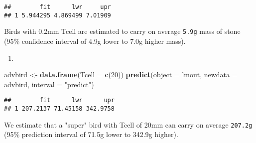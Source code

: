 \documentclass[
]{article}
\newenvironment{Shaded}{\begin{snugshade}}{\end{snugshade}}
\newcommand{\AttributeTok}[1]{\textcolor[rgb]{0.13,0.29,0.53}{#1}}
\newcommand{\DecValTok}[1]{\textcolor[rgb]{0.00,0.00,0.81}{#1}}
\newcommand{\FunctionTok}[1]{\textcolor[rgb]{0.13,0.29,0.53}{\textbf{#1}}}
\newcommand{\NormalTok}[1]{#1}
\newcommand{\OtherTok}[1]{\textcolor[rgb]{0.56,0.35,0.01}{#1}}
\newcommand{\StringTok}[1]{\textcolor[rgb]{0.31,0.60,0.02}{#1}}
\providecommand{\tightlist}{%
  \setlength{\itemsep}{0pt}\setlength{\parskip}{0pt}}
\begin{document}
\begin{verbatim}
##        fit      lwr     upr
## 1 5.944295 4.869499 7.01909
\end{verbatim}

Birds with 0.2mm Tcell are estimated to carry on average \texttt{5.9g}
mass of stone (95\% confidence interval of 4.9g lower to 7.0g higher
mass).

\begin{enumerate}
\def\labelenumi{\arabic{enumi}.}
\setcounter{enumi}{3}
\tightlist
\item
\end{enumerate}

\begin{Shaded}
\begin{Highlighting}[]
\NormalTok{advbird }\OtherTok{\textless{}{-}} \FunctionTok{data.frame}\NormalTok{(}\AttributeTok{Tcell =} \FunctionTok{c}\NormalTok{(}\DecValTok{20}\NormalTok{))}
\FunctionTok{predict}\NormalTok{(}\AttributeTok{object =}\NormalTok{ lmout, }\AttributeTok{newdata =}\NormalTok{ advbird, }\AttributeTok{interval =} \StringTok{"predict"}\NormalTok{)}
\end{Highlighting}
\end{Shaded}

\begin{verbatim}
##        fit      lwr      upr
## 1 207.2137 71.45158 342.9758
\end{verbatim}

We estimate that a "super" bird with Tcell of 20mm can carry on average
\texttt{207.2g} (95\% prediction interval of 71.5g lower to 342.9g
higher).
\end{document}
